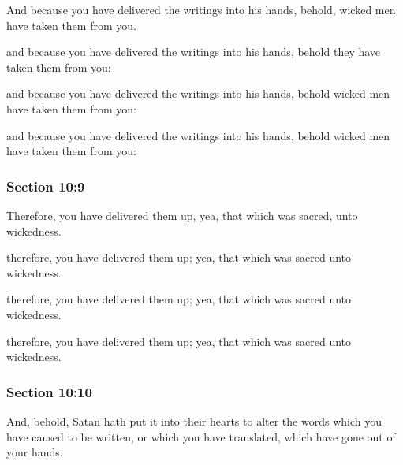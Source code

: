 		And because you have delivered the writings into his hands, behold, wicked men have taken them from you.

		\begin{framed}
		\scriptsize
			\begin{compactdesc}
				\item[JSP] and because you have delivered the writings into his hands, behold they have taken them from you:
				\item[RB1] [\textit{missing}] 
				\item[DC 1835] and because you have delivered the writings into his hands, behold wicked men have taken them from you:
				\item[DC 1844] and because you have delivered the writings into his hands, behold wicked men have taken them from you:
			\end{compactdesc}
		\end{framed}

	\subsubsection{Section 10:9} %
		\label{DC10-9}

		Therefore, you have delivered them up, yea, that which was sacred, unto wickedness.

		\begin{framed}
		\scriptsize
			\begin{compactdesc}
				\item[JSP] therefore, you have delivered them up; yea, that which was sacred unto wickedness.
				\item[RB1] [\textit{missing}] 
				\item[DC 1835] therefore, you have delivered them up; yea, that which was sacred unto wickedness.
				\item[DC 1844] therefore, you have delivered them up; yea, that which was sacred unto wickedness.
			\end{compactdesc}
		\end{framed}

	\subsubsection{Section 10:10} %
		\label{DC10-10}

		And, behold, Satan hath put it into their hearts to alter the words which you have caused to be written, or which you have translated, which have gone out of your hands.

